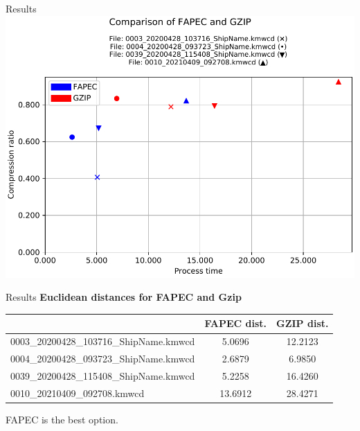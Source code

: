 \documentclass[usenames,dvipsnames]{beamer}
\begin{document}
\begin{frame}{Results}
\centering
\includegraphics[scale=0.62]{graphics/2021-05-31T23:59:08.498586-results_kmall.csv_comparison.pdf}
\end{frame}

\begin{frame}{Results}
\textbf{Euclidean distances for FAPEC and Gzip}
\vspace{1em}

\footnotesize
\begin{tabular}{|l|c|c|}
	\hline
	\rowcolor[HTML]{d6cefc} 
	\multicolumn{1}{|c|}{\cellcolor[HTML]{d6cefc}Filename}         & FAPEC dist. & GZIP dist. \\ \hline
	0003\_20200428\_103716\_ShipName.kmwcd & 5.0696      & 12.2123    \\ \hline
	0004\_20200428\_093723\_ShipName.kmwcd & 2.6879      & 6.9850     \\ \hline
	0039\_20200428\_115408\_ShipName.kmwcd & 5.2258      & 16.4260    \\ \hline
	0010\_20210409\_092708.kmwcd                                   & 13.6912     & 28.4271    \\ \hline
\end{tabular}
\normalsize
\vspace{1.5em}

FAPEC is the best option.
\end{frame}
\end{document}
